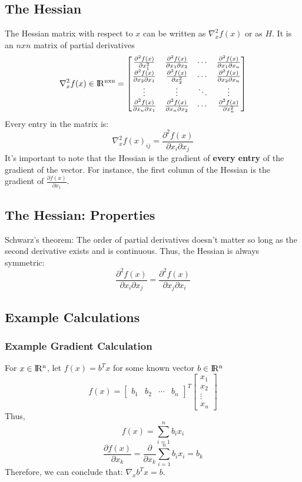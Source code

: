 \documentclass{article}
\begin{document}
\subsection{The Hessian}
The Hessian matrix with respect to $x$ can be written as $\nabla_x^2 f(x)$ or as $H$. It is an $nxn$ matrix of partial derivatives
\newline
$$\nabla_x^2 f(x) \in {\rm I\!R^{nxn}} = \begin{bmatrix}
    \frac{\partial^2 f(x)}{\partial x_1^2} & \frac{\partial^2 f(x)}{\partial x_1 \partial x_2} & \cdots & \frac{\partial^2 f(x)}{\partial x_1 \partial x_n} \\
    \frac{\partial^2 f(x)}{\partial x_2 \partial x_1} & \frac{\partial^2 f(x)}{\partial x_2^2} & \cdots & \frac{\partial^2 f(x)}{\partial x_2 \partial x_n} \\
    \vdots & \vdots & \ddots & \vdots \\
    \frac{\partial^2 f(x)}{\partial x_n \partial x_1} & \frac{\partial^2 f(x)}{\partial x_n \partial x_2} & \cdots & \frac{\partial^2 f(x)}{\partial x_n^2} \\
\end{bmatrix}
$$
\newline
Every entry in the matrix is: $$\nabla_x^2 f(x)_{ij} = \frac{\partial^2 f(x)}{\partial x_i \partial x_j}$$
\newline
It's important to note that the Hessian is the gradient of \textbf{every entry} of the gradient of the vector. For instance, the first column of the Hessian is the gradient of $\frac{\partial f(x)}{\partial x_1}$.
\subsection{The Hessian: Properties}
Schwarz's theorem: The order of partial derivatives doesn't matter so long as the second derivative exists and is continuous.
\newline
\newline
Thus, the Hessian is always symmetric:
$$\frac{\partial^2 f(x)}{\partial x_i \partial x_j} = \frac{\partial^2 f(x)}{\partial x_j \partial x_i}$$
\subsection{Example Calculations}
\subsubsection{Example Gradient Calculation}
For $x \in {\rm I\!R^{n}}$, let $f(x) = b^Tx$ for some known vector $b \in {\rm I\!R^{n}}$
$$ f(x) = \begin{bmatrix}
    b_1 & b_2 & \cdots & b_n
  \end{bmatrix}^T
  \begin{bmatrix}
  	x_1 \\
    x_2 \\
    \vdots \\
    x_n
  \end{bmatrix}
 $$
\newline
Thus, $$f(x) = \sum_{i=1}^{n} b_i x_i$$
$$\frac{\partial f(x)}{\partial x_k} = \frac{\partial}{\partial x_k}\sum_{i=1}^{n} b_i x_i = b_k$$
Therefore, we can conclude that: $\nabla_x b^Tx = b$.
\end{document}
